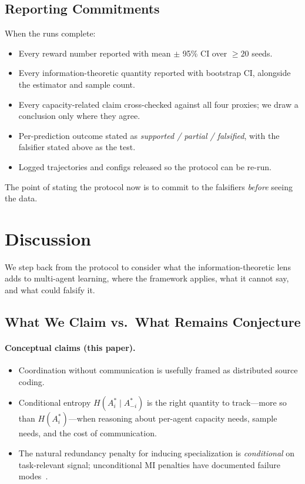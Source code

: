 \documentclass[10pt, letterpaper]{article}
\begin{document}
\subsection{Reporting Commitments}

When the runs complete:
\begin{itemize}
    \item Every reward number reported with mean $\pm$ 95\% CI over $\geq 20$ seeds.
    \item Every information-theoretic quantity reported with bootstrap CI, alongside the estimator and sample count.
    \item Every capacity-related claim cross-checked against all four proxies; we draw a conclusion only where they agree.
    \item Per-prediction outcome stated as \emph{supported / partial / falsified}, with the falsifier stated above as the test.
    \item Logged trajectories and configs released so the protocol can be re-run.
\end{itemize}

The point of stating the protocol now is to commit to the falsifiers \emph{before} seeing the data.

\section{Discussion}
\label{sec:discussion}

We step back from the protocol to consider what the information-theoretic lens adds to multi-agent learning, where the framework applies, what it cannot say, and what could falsify it.

\subsection{What We Claim vs.\ What Remains Conjecture}

\paragraph{Conceptual claims (this paper).}
\begin{itemize}
    \item Coordination without communication is usefully framed as distributed source coding.
    \item Conditional entropy $H(A_i^*\mid A_{-i}^*)$ is the right quantity to track---more so than $H(A_i^*)$---when reasoning about per-agent capacity needs, sample needs, and the cost of communication.
    \item The natural redundancy penalty for inducing specialization is \emph{conditional} on task-relevant signal; unconditional MI penalties have documented failure modes~\cite{li2022pmic}.
\end{itemize}
\end{document}
